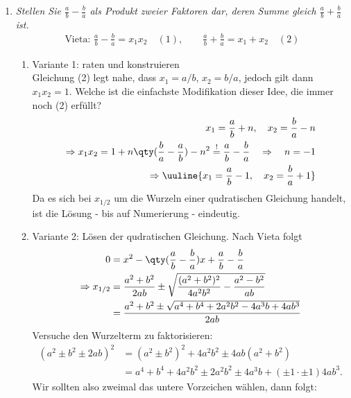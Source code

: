 \begin{enumerate}[label=(\alph*)]
    \item \emph{Stellen Sie $\textstyle\frac{a}{b}-\frac{b}{a}$ als Produkt zweier Faktoren dar, deren Summe gleich $\textstyle\frac{a}{b}+\frac{b}{a}$ ist.}
    \begin{align}
        \text{Vieta: }\frac{a}{b} - \frac{b}{a} = x_1 x_2 \quad (1), \qquad \frac{a}{b}+\frac{b}{a} = x_1 + x_2 \quad (2)
    \end{align}
    \begin{enumerate}[label=\arabic*)]
        \item Variante 1: raten und konstruieren\\
        Gleichung (2) legt nahe, dass $x_1 = a/b$, $x_2 = b/a$, jedoch gilt dann $x_1 x_2 = 1$. Welche ist die einfachste Modifikation dieser Idee, die immer noch (2) erfüllt? 
        \begin{align}
            x_1 = \frac{a}{b} + n, \quad x_2 = \frac{b}{a} -n \\
            \Rightarrow x_1 x_2 = 1 + n\qty(\frac{b}{a}-\frac{a}{b}) - n^2 \overset{!}{=} \frac{a}{b} - \frac{b}{a} \quad \Rightarrow \quad n=-1 \\
            \Rightarrow \uuline{x_1 = \frac{a}{b}-1, \quad x_2 = \frac{b}{a}+1}
        \end{align}
        Da es sich bei $x_{1/2}$ um die Wurzeln einer qudratischen Gleichung handelt, ist die Lösung - bis auf Numerierung - eindeutig.
        \item Variante 2: Lösen der qudratischen Gleichung. Nach Vieta folgt  
        \begin{align}
            0 &= x^2 - \qty(\frac{a}{b}-\frac{b}{a})x + \frac{a}{b} - \frac{b}{a} \\
            \Rightarrow x_{1/2} &= \frac{a^2 + b^2}{2ab}\pm \sqrt{\frac{(a^2+b^2)^2}{4a^2b^2} - \frac{a^2-b^2}{ab}} \\
            &= \frac{a^2 +b^2 \pm \sqrt{a^4+b^4 +2a^2b^2 -4a^3b + 4ab^3}}{2ab} 
        \end{align}
        Versuche den Wurzelterm zu faktorisieren:
        \begin{align}
            (a^2 \pm b^2 \pm 2ab)^2 &= (a^2 \pm b^2)^2 + 4a^2 b^2 \pm 4ab(a^2 +b^2)\\
            &= a^4 + b^4 + 4a^2b^2 \pm 2a^2b^2  \pm 4a^3b +(\pm1 \cdot \pm1) 4ab^3.
        \end{align}
        Wir sollten also zweimal das untere Vorzeichen wählen, dann folgt: 
        \begin{align}

\end{align}
\end{enumerate}
\end{enumerate}
